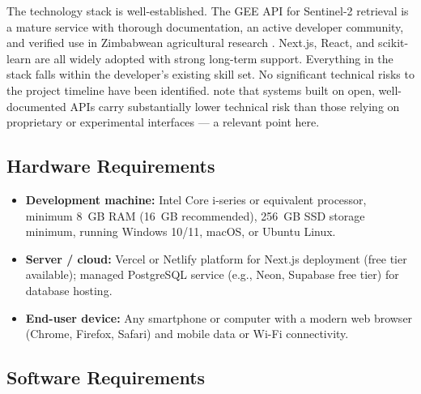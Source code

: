 \documentclass[12pt,a4paper]{report}
\begin{document}
The technology stack is well-established. The GEE API for Sentinel-2 retrieval is a mature service with thorough documentation, an active developer community, and verified use in Zimbabwean agricultural research \citep{rwizi2021}. Next.js, React, and scikit-learn are all widely adopted with strong long-term support. Everything in the stack falls within the developer's existing skill set. No significant technical risks to the project timeline have been identified. \citet{perera2015} note that systems built on open, well-documented APIs carry substantially lower technical risk than those relying on proprietary or experimental interfaces — a relevant point here.

\subsection{Hardware Requirements}

\begin{itemize}
  \item \textbf{Development machine:} Intel Core i-series or equivalent processor, minimum 8~GB RAM (16~GB recommended), 256~GB SSD storage minimum, running Windows 10/11, macOS, or Ubuntu Linux.
  \item \textbf{Server / cloud:} Vercel or Netlify platform for Next.js deployment (free tier available); managed PostgreSQL service (e.g., Neon, Supabase free tier) for database hosting.
  \item \textbf{End-user device:} Any smartphone or computer with a modern web browser (Chrome, Firefox, Safari) and mobile data or Wi-Fi connectivity.
\end{itemize}

\subsection{Software Requirements}
\end{document}
